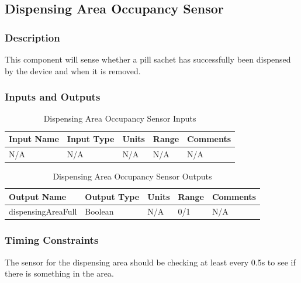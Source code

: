 \documentclass[12pt,titlepage]{article}
\begin{document}
\subsection{Dispensing Area Occupancy Sensor}
\subsubsection*{Description}
This component will sense whether a pill sachet has successfully been dispensed by the device and when it is removed.
\subsubsection*{Inputs and Outputs}

\begin{table}[ht!]
\begin{center}
\begin{adjustbox}{max width=\textwidth}
\small
\begin{tabular}{|p{}|p{}|p{}|p{}|p{}|}
 \hline
 \textbf{Input Name} & \textbf{Input Type} & \textbf{Units} &\textbf{Range} & \textbf{Comments} \\
 \hline 
 N/A & N/A  & N/A & N/A & N/A \\
 \hline
\end{tabular}
\end{adjustbox}
\end{center}
\caption{Dispensing Area Occupancy Sensor Inputs}
\end{table}

\begin{table}[ht!]
\begin{center}
\begin{adjustbox}{max width=\textwidth}
\small
\begin{tabular}{|p{}|p{}|p{}|p{}|p{}|}
 \hline
 \textbf{Output Name} & \textbf{Output Type} & \textbf{Units} &\textbf{Range} & \textbf{Comments} \\
 \hline 
 dispensingAreaFull & Boolean & N/A & 0/1 & N/A \\
 \hline
\end{tabular}
\end{adjustbox}
\end{center}
\caption{Dispensing Area Occupancy Sensor Outputs}
\end{table}

\subsubsection*{Timing Constraints}
The sensor for the dispensing area should be checking at least every 0.5s to see if there is something in the area.
\end{document}
